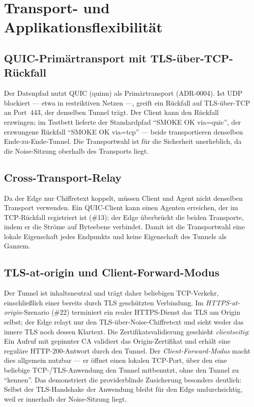 \section{Transport- und Applikationsflexibilität}
\label{sec:transport}

\subsection{QUIC-Primärtransport mit TLS-über-TCP-Rückfall}
\label{subsec:transport}

Der Datenpfad nutzt QUIC (quinn) als Primärtransport (ADR-0004). Ist UDP
blockiert --- etwa in restriktiven Netzen ---, greift ein Rückfall auf
TLS-über-TCP an Port~443, der denselben Tunnel trägt. Der Client kann den
Rückfall erzwingen; im Testbett lieferte der Standardpfad
\enquote{SMOKE OK via=quic}, der erzwungene Rückfall
\enquote{SMOKE OK via=tcp} --- beide transportieren denselben
Ende-zu-Ende-Tunnel. Die Transportwahl ist für die Sicherheit unerheblich, da
die Noise-Sitzung oberhalb des Transports liegt.

\subsection{Cross-Transport-Relay}
\label{subsec:crosstransport}

Da der Edge nur Chiffretext koppelt, müssen Client und Agent nicht denselben
Transport verwenden. Ein QUIC-Client kann einen Agenten erreichen, der im
TCP-Rückfall registriert ist (\#13); der Edge überbrückt die beiden Transporte,
indem er die Ströme auf Byteebene verbindet. Damit ist die Transportwahl eine
lokale Eigenschaft jedes Endpunkts und keine Eigenschaft des Tunnels als
Ganzem.

\subsection{TLS-at-origin und Client-Forward-Modus}
\label{subsec:tlsatorigin}

Der Tunnel ist inhaltsneutral und trägt daher beliebigen TCP-Verkehr,
einschließlich einer bereits durch TLS geschützten Verbindung. Im
\emph{HTTPS-at-origin}-Szenario (\#22) terminiert ein realer HTTPS-Dienst das TLS
am Origin selbst; der Edge relayt nur den TLS-über-Noise-Chiffretext und sieht
weder das innere TLS noch dessen Klartext. Die Zertifikatsvalidierung geschieht
\emph{clientseitig}: Ein Aufruf mit gepinnter CA validiert das Origin-Zertifikat
und erhält eine reguläre HTTP-200-Antwort durch den Tunnel. Der
\emph{Client-Forward-Modus} macht dies allgemein nutzbar --- er öffnet einen
lokalen TCP-Port, über den eine beliebige TCP-/TLS-Anwendung den Tunnel
mitbenutzt, ohne den Tunnel zu \enquote{kennen}. Das demonstriert die
providerblinde Zusicherung besonders deutlich: Selbst der TLS-Handshake der
Anwendung bleibt für den Edge undurchsichtig, weil er innerhalb der
Noise-Sitzung liegt.

